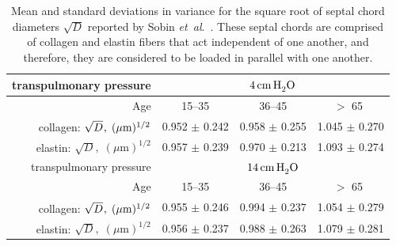 \begin{table}
    \centering
    \begin{tabular}{|r|ccc|} 
        \hline 
        transpulmonary pressure &
        \multicolumn{3}{|c|}{$4 \, \mathrm{cm} \, \mathrm{H}_2^{\vphantom{|}} \mathrm{O}$} \\ 
        \hline
        Age & 15--35 & 36--45 & $>$ 65 $\vphantom{|}^{\vphantom{|}}$ \\ \hline 
        collagen: $\sqrt{D}^{\vphantom{|}}, \; ( \mu \textrm{m} )^{1/2}$ & 
        0.952 $\pm$ 0.242 & 0.958 $\pm$ 0.255 & 1.045 $\pm$ 0.270 \\
        elastin: $\sqrt{D}, \; ( \mu \textrm{m} )^{1/2}$ & 
        0.957 $\pm$ 0.239 & 0.970 $\pm$ 0.213 & 1.093 $\pm$ 0.274 \\
        \hline\hline       
        transpulmonary pressure &
        \multicolumn{3}{|c|}{$14 \, \mathrm{cm} \, \mathrm{H}_2^{\vphantom{|}} \mathrm{O}$} \\ 
        \hline
        Age & 15--35 & 36--45 & $>$ 65 $\vphantom{|}^{\vphantom{|}}$ \\ \hline 
        collagen: $\sqrt{D}^{\vphantom{|}}, \; ( \mu \textrm{m} )^{1/2}$ & 
        0.955 $\pm$ 0.246 & 0.994 $\pm$ 0.237 & 1.054 $\pm$ 0.279 \\
        elastin: $\sqrt{D}, \; ( \mu \textrm{m} )^{1/2}$ & 
        0.956 $\pm$ 0.237 & 0.988 $\pm$ 0.263 & 1.079 $\pm$ 0.281 \\
        \hline
    \end{tabular}
    \caption{\label{tab:alveolarProp}
        Mean and standard deviations in variance for the square root of septal chord diameters $\sqrt{D}$ reported by Sobin \textit{et~al}.\ \cite{Sobinetal88}.  These septal chords are comprised of collagen and elastin fibers that act independent of one another, and therefore, they are considered to be loaded in parallel with one another.}
\end{table}

